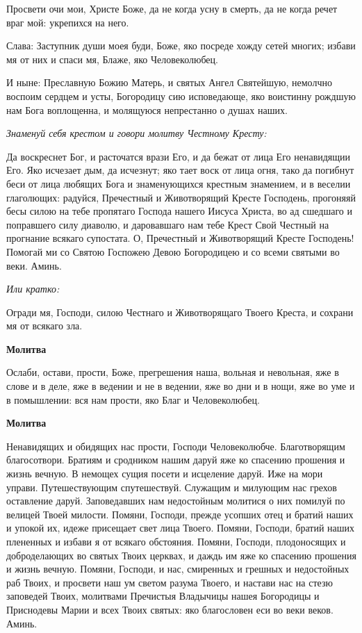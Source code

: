 Просвети очи мои, Христе Боже, да не когда усну в смерть, да не когда речет враг мой: укрепихся на него.


Слава: Заступник души моея буди, Боже, яко посреде хожду сетей многих; избави мя от них и спаси мя, Блаже, яко Человеколюбец. 


И ныне: Преславную Божию Матерь, и святых Ангел Святейшую, немолчно воспоим сердцем и усты, Богородицу сию исповедающе, яко воистинну рождшую нам Бога воплощенна, и молящуюся непрестанно о душах наших.


\medskip
\itshape Знаменуй себя крестом и говори молитву Честному Кресту:\normalfont{}


Да воскреснет Бог, и расточатся врази Его, и да бежат от лица Его ненавидящии Его. Яко исчезает дым, да исчезнут; яко тает воск от лица огня, тако да погибнут беси от лица любящих Бога и знаменующихся крестным знамением, и в веселии глаголющих: радуйся, Пречестный и Животворящий Кресте Господень, прогоняяй бесы силою на тебе пропятаго Господа нашего Иисуса Христа, во ад сшедшаго и поправшего силу диаволю, и даровавшаго нам тебе Крест Свой Честный на прогнание всякаго супостата. О, Пречестный и Животворящий Кресте Господень! Помогай ми со Святою Госпожею Девою Богородицею и со всеми святыми во веки. Аминь.


\medskip
\itshape Или кратко:\normalfont{}


Огради мя, Господи, силою Честнаго и Животворящаго Твоего Креста, и сохрани мя от всякаго зла.


\medskip
\bfseries Молитва\normalfont{}\nopagebreak


Ослаби, остави, прости, Боже, прегрешения наша, вольная и невольная, яже в слове и в деле, яже в ведении и не в ведении, яже во дни и в нощи, яже во уме и в помышлении: вся нам прости, яко Благ и Человеколюбец.


\medskip
\bfseries Молитва\normalfont{}\nopagebreak


Ненавидящих и обидящих нас прости, Господи Человеколюбче. Благотворящим благосотвори. Братиям и сродником нашим даруй яже ко спасению прошения и жизнь вечную. В немощех сущия посети и исцеление даруй. Иже на мори управи. Путешествующим спутешествуй. Служащим и милующим нас грехов оставление даруй. Заповедавших нам недостойным молитися о них помилуй по велицей Твоей милости. Помяни, Господи, прежде усопших отец и братий наших и упокой их, идеже присещает свет лица Твоего. Помяни, Господи, братий наших плененных и избави я от всякаго обстояния. Помяни, Господи, плодоносящих и доброделающих во святых Твоих церквах, и даждь им яже ко спасению прошения и жизнь вечную. Помяни, Господи, и нас, смиренных и грешных и недостойных раб Твоих, и просвети наш ум светом разума Твоего, и настави нас на стезю заповедей Твоих, молитвами Пречистыя Владычицы нашея Богородицы и Приснодевы Марии и всех Твоих святых: яко благословен еси во веки веков. Аминь.


